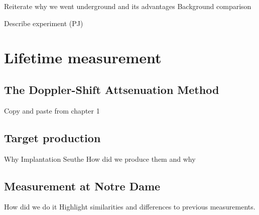 Reiterate why we went underground and its advantages
Background comparison

Describe experiment (PJ)


\section{Lifetime measurement}
\label{sec: lifetime experiment}

\subsection{The Doppler-Shift Attsenuation Method}
\label{sec: DSAM}

Copy and paste from chapter 1

\subsection{Target production}
\label{sec: implantation}

Why Implantation
Seuthe
How did we produce them and why

\subsection{Measurement at Notre Dame}

How did we do it
Highlight similarities and differences to previous measurements.




%
% 
% 
